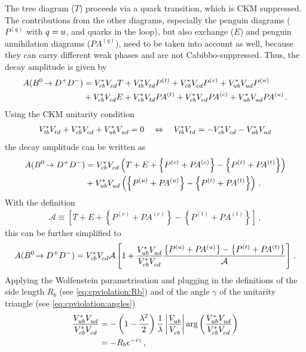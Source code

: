 The tree diagram ($T$) proceeds via a \bToccbard quark transition, which is
CKM suppressed. The contributions from the other diagrams, especially the
penguin diagrams ($P^{(q)}$ with $q = {u}$, \cquark and \tquark quarks in the
loop), but also exchange ($E$) and penguin annihilation diagrams
($P\!A^{(q)}$), need to be taken into account as well, because they can carry
different weak phases and are not Cabibbo-suppressed. Thus, the decay
amplitude is given by~\cite{Fleischer1999,Fleischer2007,Bel:2015wha}
\begin{align}
\begin{split}
	A({{B}^0}\!\rightarrow {\ensuremath{{D}^+}}{\ensuremath{{D}^-}}) &= {V_{{c}{b}}^\ast}{V_{{c}{d}}^{}} T + {V_{{t}{b}}^\ast}{V_{{t}{d}}^{}} P^{(t)} + {V_{{c}{b}}^\ast}{V_{{c}{d}}^{}} P^{(c)} + {V_{{u}{b}}^\ast}{V_{{u}{d}}^{}} P^{(u)}\\
			   &+ {V_{{c}{b}}^\ast}{V_{{c}{d}}^{}} E + {V_{{c}{b}}^\ast}{V_{{t}{d}}^{}} P\!A^{(t)} + {V_{{c}{b}}^\ast}{V_{{c}{d}}^{}} P\!A^{(c)} + {V_{{u}{b}}^\ast}{V_{{u}{d}}^{}} P\!A^{(u)}\,.
\end{split}
\end{align}
Using the CKM unitarity condition
\begin{align}
	{\ensuremath{V_{{t}{b}}^\ast}}{\ensuremath{V_{{t}{d}}^{}}} + {V_{{c}{b}}^\ast}{V_{{c}{d}}^{}} + {V_{{u}{b}}^\ast}{V_{{u}{d}}^{}} = 0 \quad\Leftrightarrow\quad {\ensuremath{V_{{t}{b}}^\ast}}{\ensuremath{V_{{t}{d}}^{}}} = - {V_{{c}{b}}^\ast}{V_{{c}{d}}^{}} - {V_{{u}{b}}^\ast}{V_{{u}{d}}^{}}
\end{align}
the decay amplitude can be written as
\begin{align}
\begin{split}
	A({{B}^0}\!\rightarrow {\ensuremath{{D}^+}}{\ensuremath{{D}^-}}) &= {V_{{c}{b}}^\ast}{V_{{c}{d}}^{}} \left(T + E + \left\{P^{(c)} + P\!A^{(c)}\right\} - \left\{P^{(t)} + P\!A^{(t)}\right\}\right)\\
			   &+ {V_{{u}{b}}^\ast}{V_{{u}{d}}^{}} \left(\left\{P^{(u)} + P\!A^{(u)}\right\} - \left\{P^{(t)} + P\!A^{(t)}\right\}\right)\,.
\end{split}
\end{align}
With the definition
\begin{align}
	\mathcal{A} \equiv \left[T + E + \left\{P^{(c)} + P\!A^{(c)}\right\} - \left\{P^{(t)} + P\!A^{(t)}\right\}\right]\,,
\end{align}
this can be further simplified to
\begin{align}
	A({{B}^0}\!\rightarrow {\ensuremath{{D}^+}}{\ensuremath{{D}^-}}) = {V_{{c}{b}}^\ast}{V_{{c}{d}}^{}} \mathcal{A}\left[1 + \frac{{V_{{u}{b}}^\ast}{V_{{u}{d}}^{}}}{{V_{{c}{b}}^\ast}{V_{{c}{d}}^{}}} \frac{\left\{P^{(u)} + P\!A^{(u)}\right\} - \left\{P^{(t)} + P\!A^{(t)}\right\}}{\mathcal{A}}\right]\,.
\end{align}
Applying the Wolfenstein parametrisation and plugging in the definitions of the
side length $R_b$ (see \cref{eq:cpviolation:Rb}) and of the angle $\gamma$ of
the unitarity triangle (see \cref{eq:cpviolation:angles})
\begin{align}
	\frac{{V_{{u}{b}}^\ast}{V_{{u}{d}}^{}}}{{V_{{c}{b}}^\ast}{V_{{c}{d}}^{}}} &= -\left(1 - \frac{\lambda^2}2\right)\frac 1\lambda \left|\frac {{V_{{u}{b}}^{}}}{{V_{{c}{b}}^{}}}\right| \text{arg}\left(\frac{{V_{{u}{b}}^\ast}{V_{{u}{d}}^{}}}{{V_{{c}{b}}^\ast}{V_{{c}{d}}^{}}}\right)\\
	&= -R_b e^{-i\gamma}\,,
\end{align}

